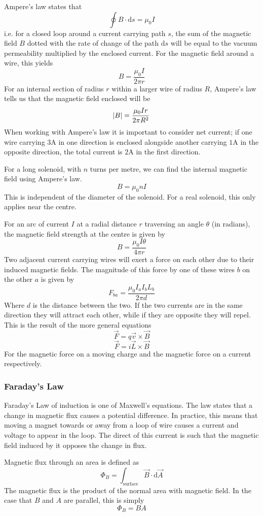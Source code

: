\documentclass[12pt]{report}
\begin{document}
\begin{flushleft}
Ampere's law states that
\[\oint B\cdot\mathrm{d}s = \mu_0I\]
i.e. for a closed loop around a current carrying path \(s\), the sum of the
magnetic field \(B\) dotted with the rate of change of the path \(\mathrm{d}s\)
will be equal to the vacuum permeability multiplied by the enclosed current.
For the magnetic field around a wire, this yields
\[B = \frac{\mu_0I}{2\pi r}\]
For an internal section of radius \(r\) within a larger wire of radius \(R\),
Ampere's law tells us that the magnetic field enclosed will be
\[\abs{B} = \frac{\mu_0Ir}{2\pi R^2}\]
When working with Ampere's law it is important to consider net current; if one
wire carrying \(3\mathrm{A}\) in one direction is enclosed alongside another
carrying \(1\mathrm{A}\) in the opposite direction, the total current is
\(2\mathrm{A}\) in the first direction. \par
For a long solenoid, with \(n\) turns per metre, we can find the internal
magnetic field using Ampere's law.
\[B = \mu_0nI\]
This is independent of the diameter of the solenoid. For a real solenoid, this
only applies near the centre. \par
For an arc of current \(I\) at a radial distance \(r\) traversing an angle
\(\theta\) (in radians), the magnetic field strength at the centre is given by
\[B = \frac{\mu_0I\theta}{4\pi r}\]
Two adjacent current carrying wires will exert a force on each other due to
their induced magnetic fields. The magnitude of this force by one of these
wires \(b\) on the other \(a\) is given by
\[F_{ba} = \frac{\mu_0I_aI_bL_b}{2\pi d}\]
Where \(d\) is the distance between the two. If the two currents are in the
same direction they will attract each other, while if they are opposite they
will repel. This is the result of the more general equations
\[\vec{F} = q\vec{v}\times\vec{B}\]
\[\vec{F} = i\vec{L}\times\vec{B}\]
For the magnetic force on a moving charge and the magnetic force on a current
respectively.

\subsubsection*{Faraday's Law}

Faraday's Law of induction is one of Maxwell's equations. The law states that
a change in magnetic flux causes a potential difference. In practice, this
means that moving a magnet towards or away from a loop of wire causes a current
and voltage to appear in the loop. The direct of this current is such that the
magnetic field induced by it opposes the change in flux. \par
Magnetic flux through an area is defined as
\[\Phi_B = \int_\mathrm{surface} \vec{B}\cdot\mathrm{d}\vec{A}\]
The magnetic flux is the product of the normal area with magnetic field. In
the case that \(B\) and \(A\) are parallel, this is simply
\[\Phi_B = BA\]


\end{flushleft}
\end{document}
